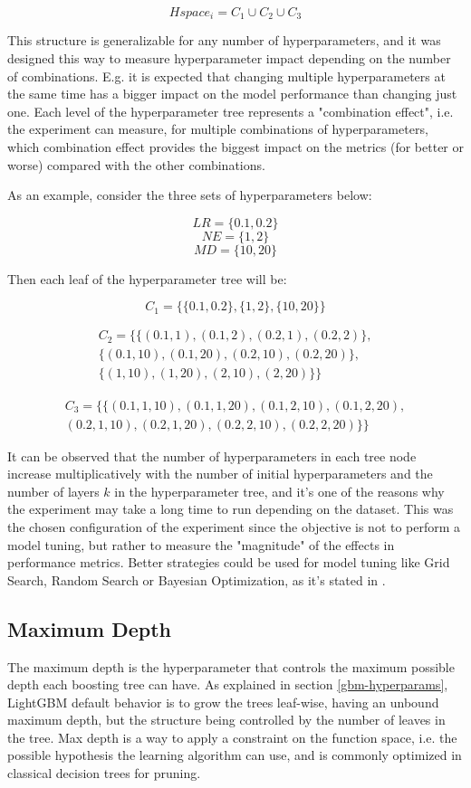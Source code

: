 $$Hspace_i = C_1 \cup C_2 \cup C_3$$

This structure is generalizable for any number of hyperparameters, and it was designed this way to measure hyperparameter impact depending on the number of combinations. E.g. it is expected that changing multiple hyperparameters at the same time has a bigger impact on the model performance than changing just one. Each level of the hyperparameter tree represents a "combination effect", i.e. the experiment can measure, for multiple combinations of hyperparameters, which combination effect provides the biggest impact on the metrics (for better or worse) compared with the other combinations.

As an example, consider the three sets of hyperparameters below:

$$LR = \{0.1, 0.2\}$$
$$NE = \{1, 2\}$$
$$MD = \{10, 20\}$$

Then each leaf of the hyperparameter tree will be:

$$C_1 = \Big\{\{0.1, 0.2\}, \{1, 2\}, \{10, 20\}\Big\}$$

\begin{align*}
    C_2 = \Big\{\{(0.1, 1), (0.1, 2), (0.2, 1), (0.2, 2)\}, \\
            \{(0.1, 10), (0.1, 20), (0.2, 10), (0.2, 20)\}, \\
            \{(1, 10), (1, 20), (2, 10), (2, 20)\}\Big\}
\end{align*}

\begin{align*}
    C_3 = \Big\{\{(0.1, 1, 10), (0.1, 1, 20), (0.1, 2, 10), (0.1, 2, 20), \\
    (0.2, 1, 10), (0.2, 1, 20), (0.2, 2, 10), (0.2, 2, 20)\}\Big\}
\end{align*}

It can be observed that the number of hyperparameters in each tree node increase multiplicatively with the number of initial hyperparameters and the number of layers $k$ in the hyperparameter tree, and it's one of the reasons why the experiment may take a long time to run depending on the dataset. This was the chosen configuration of the experiment since the objective is not to perform a model tuning, but rather to measure the "magnitude" of the effects in performance metrics. Better strategies could be used for model tuning like Grid Search, Random Search or Bayesian Optimization, as it's stated in \cite{probst2018tunability}.

\subsection{Maximum Depth}
\label{subsec:max-depth}
The maximum depth is the hyperparameter that controls the maximum possible depth each boosting tree can have. As explained in section \ref{gbm-hyperparams}, LightGBM default behavior is to grow the trees leaf-wise, having an unbound maximum depth, but the structure being controlled by the number of leaves in the tree. Max depth is a way to apply a constraint on the function space, i.e. the possible hypothesis the learning algorithm can use, and is commonly optimized in classical decision trees for pruning. 

